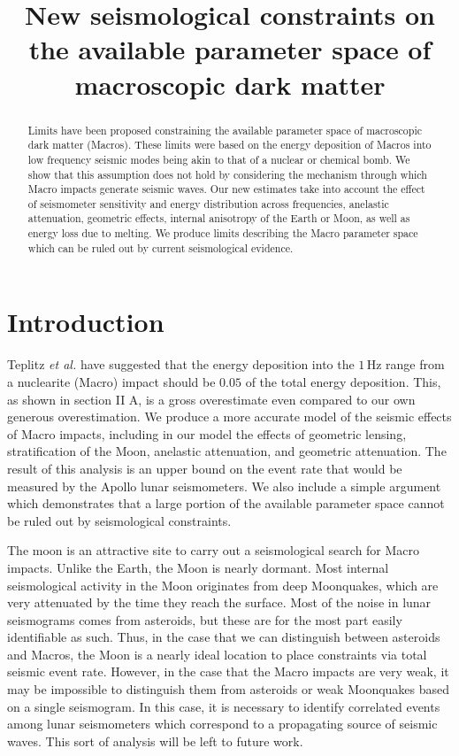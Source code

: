 \documentclass[prd,reprint,10pt]{revtex4-1}
\newcommand*\te[1]{\text{#1}}
\begin{document}
\title{New seismological constraints on the available parameter space of macroscopic dark matter}
\author{}

\begin{abstract}
Limits have been proposed constraining the available parameter space of macroscopic dark matter (Macros). These limits were based on the energy deposition of Macros into low frequency seismic modes being akin to that of a nuclear or chemical bomb. We show that this assumption does not hold by considering the mechanism through which Macro impacts generate seismic waves. Our new estimates take into account the effect of seismometer sensitivity and energy distribution across frequencies, anelastic attenuation, geometric effects, internal anisotropy of the Earth or Moon, as well as energy loss due to melting. We produce limits describing the Macro parameter space which can be ruled out by current seismological evidence.
\end{abstract}
\maketitle
\section{Introduction}
Teplitz \textit{et al.} \cite{banerdt2005seismic} have suggested that the energy deposition into the $1\,\te{Hz}$ range from a nuclearite (Macro) impact should be $0.05$ of the total energy deposition. This, as shown in section II A, is a gross overestimate even compared to our own generous overestimation. We produce a more accurate model of the seismic effects of Macro impacts, including in our model the effects of geometric lensing, stratification of the Moon, anelastic attenuation, and geometric attenuation. The result of this analysis is an upper bound on the event rate that would be measured by the Apollo lunar seismometers. We also include a simple argument which demonstrates that a large portion of the available parameter space cannot be ruled out by seismological constraints.

The moon is an attractive site to carry out a seismological search for Macro impacts. Unlike the Earth, the Moon is nearly dormant. Most internal seismological activity in the Moon originates from deep Moonquakes, which are very attenuated by the time they reach the surface. Most of the noise in lunar seismograms comes from asteroids, but these are for the most part easily identifiable as such. Thus, in the case that we can distinguish between asteroids and Macros, the Moon is a nearly ideal location to place constraints via total seismic event rate. However, in the case that the Macro impacts are very weak, it may be impossible to distinguish them from asteroids or weak Moonquakes based on a single seismogram. In this case, it is necessary to identify correlated events among lunar seismometers which correspond to a propagating source of seismic waves. This sort of analysis will be left to future work.
\end{document}
